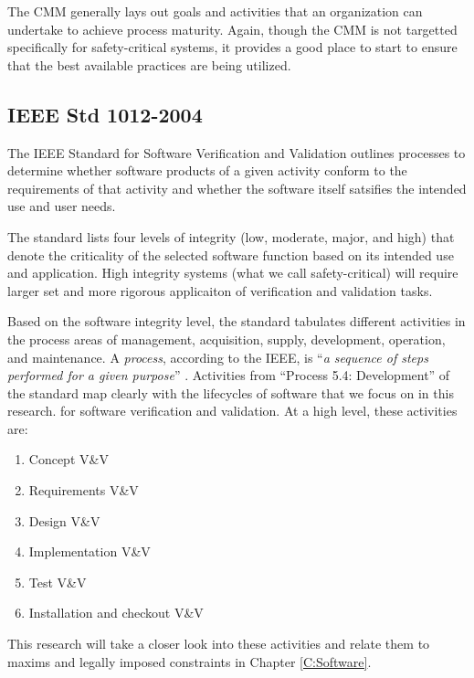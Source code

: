 The CMM generally lays out goals and activities that an organization can
undertake to achieve process maturity. Again, though the CMM is not targetted
specifically for safety-critical systems, it provides a good place to start to
ensure that the best available practices are being utilized.

\subsection{IEEE Std 1012-2004}
The IEEE Standard for Software Verification and Validation \cite{IEEE-std-verif}
outlines processes to determine whether software products of a given activity
conform to the requirements of that activity and whether the software itself
satsifies the intended use and user needs.

The standard lists four levels of integrity (low, moderate, major, and high)
that denote the criticality of the selected software function based on its
intended use and application. High integrity systems (what we call 
safety-critical) will require larger set and more rigorous applicaiton of
verification and validation tasks.

Based on the software integrity level, the standard tabulates different
activities in the process areas of management, acquisition, supply, development,
operation, and maintenance. A \textit{process}, according to the IEEE, is 
``\textit{a sequence of steps performed for a given purpose}''
\cite{IEEE-glossary}. Activities from ``Process 5.4: Development'' of the
standard map clearly with the lifecycles of software that we focus on in this
research. for software verification and validation. At a high level, these
activities are:\singlespace
\begin{enumerate}
  \item Concept V\&V
  \item Requirements V\&V
  \item Design V\&V
  \item Implementation V\&V
  \item Test V\&V
  \item Installation and checkout V\&V
\end{enumerate}
\doublespace
This research will take a closer look into these activities and relate them to
maxims and legally imposed constraints in Chapter \ref{C:Software}.



